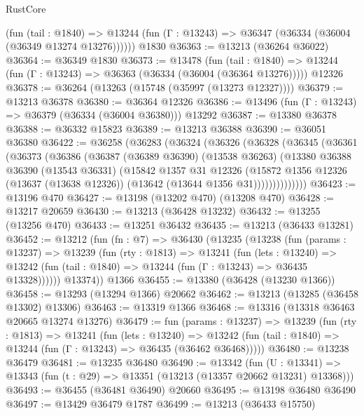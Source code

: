 \begin{lexlean}{RustCore}
\begin{coremodule}
      (fun (tail : @1840) =>
      @13244 (fun (Γ : @13243) => @36347 (@36334 (@36004 (@36349 @13274 @13276))))))
    @1830
@36363 := @13213 (@36264 @36022)
@36364 := @36349 @1830
@36373 := @13478
    (fun (tail : @1840) => @13244 (fun (Γ : @13243) => @36363 (@36334 (@36004 (@36364 @13276)))))
    @12326
@36378 := @36264 (@13263 (@15748 (@35997 (@13273 @12327))))
@36379 := @13213 @36378
@36380 := @36364 @12326
@36386 := @13496 (fun (Γ : @13243) => @36379 (@36334 (@36004 @36380))) @13292
@36387 := @13380 @36378
@36388 := @36332 @15823
@36389 := @13213 @36388
@36390 := @36051 @36380
@36422 := @36258
    (@36283
      (@36324
        (@36326
          (@36328
            (@36345
              (@36361
                (@36373
                  (@36386
                    (@36387
                      (@36389 @36390)
                      (@13538 @36263)
                      (@13380
                        @36388
                        @36390
                        (@13543 @36331)
                        (@15842
                          @1357
                          @31
                          @12326
                          (@15872
                            @1356
                            @12326
                            (@13637 (@13638 @12326))
                            (@13642 (@13644 @1356 @31))))))))))))))
@36423 := @13196 @470
@36427 := @13198 (@13202 @470) (@13208 @470)
@36428 := @13217 @20659
@36430 := @13213 (@36428 @13232)
@36432 := @13255 (@13256 @470)
@36433 := @13251 @36432
@36435 := @13213 (@36433 @13281)
@36452 := @13212
    (fun (fn : @7) =>
    @36430
      (@13235
        (@13238
          (fun (params : @13237) =>
          @13239
            (fun (rty : @1813) =>
            @13241
              (fun (lets : @13240) =>
              @13242 (fun (tail : @1840) => @13244 (fun (Γ : @13243) => @36435 @13328))))))
        @13374))
    @1366
@36455 := @13380 (@36428 (@13230 @1366))
@36458 := @13293 (@13294 @1366) @20662
@36462 := @13213 (@13285 (@36458 @13302) @13306)
@36463 := @13319 @1366
@36468 := @13316 (@13318 @36463 @20665 @13274 @13276)
@36479 := fun (params : @13237) =>
  @13239
    (fun (rty : @1813) =>
    @13241
      (fun (lets : @13240) =>
      @13242 (fun (tail : @1840) => @13244 (fun (Γ : @13243) => @36435 (@36462 @36468)))))
@36480 := @13238 @36479
@36481 := @13235 @36480
@36490 := @13342
    (fun (U : @13341) => @13343 (fun (t : @29) => @13351 (@13213 (@13357 @20662 @13231) @13368)))
@36493 := @36455 (@36481 @36490) @20660
@36495 := @13198 @36480 @36490
@36497 := @13429 @36479 @1787
@36499 := @13213 (@36433 @15750)

\end{coremodule}
\end{lexlean}
